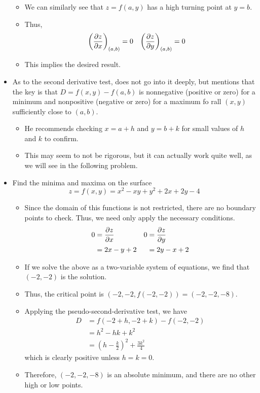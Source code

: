 \documentclass[../main.tex]{subfiles}
\begin{document}
\begin{itemize}
\begin{itemize}
        \item We can similarly see that $z=f(a,y)$ has a high turning point at $y=b$.
        \item Thus,
        \begin{align*}
            \left( \pdv{z}{x} \right)_{(a,b)} &= 0&
                \left( \pdv{z}{y} \right)_{(a,b)} &= 0
        \end{align*}
        \item This implies the desired result.
    \end{itemize}
    \item As to the second derivative test, \cite{bib:Thomas} does not go into it deeply, but mentions that the key is that $D=f(x,y)-f(a,b)$ is nonnegative (positive or zero) for a minimum and nonpositive (negative or zero) for a maximum fo rall $(x,y)$ sufficiently close to $(a,b)$.
    \begin{itemize}
        \item He recommends checking $x=a+h$ and $y=b+k$ for small values of $h$ and $k$ to confirm.
        \item This may seem to not be rigorous, but it can actually work quite well, as we will see in the following problem.
    \end{itemize}
    \item Find the minima and maxima on the surface
    \begin{equation*}
        z = f(x,y) = x^2-xy+y^2+2x+2y-4
    \end{equation*}
    \begin{itemize}
        \item Since the domain of this functions is not restricted, there are no boundary points to check. Thus, we need only apply the necessary conditions.
        \begin{align*}
            0 &= \pdv{z}{x}&
                0 &= \pdv{z}{y}\\
            &= 2x-y+2&
                &= 2y-x+2
        \end{align*}
        \item If we solve the above as a two-variable system of equations, we find that $(-2,-2)$ is the solution.
        \item Thus, the critical point is $(-2,-2,f(-2,-2))=(-2,-2,-8)$.
        \item Applying the pseudo-second-derivative test, we have
        \begin{align*}
            D &= f(-2+h,-2+k)-f(-2,-2)\\
            &= h^2-hk+k^2\\
            &= \left( h-\frac{k}{2} \right)^2+\frac{3k^2}{4}
        \end{align*}
        which is clearly positive unless $h=k=0$.
        \item Therefore, $(-2,-2,-8)$ is an absolute minimum, and there are no other high or low points.
    \end{itemize}
\end{itemize}
\end{document}
